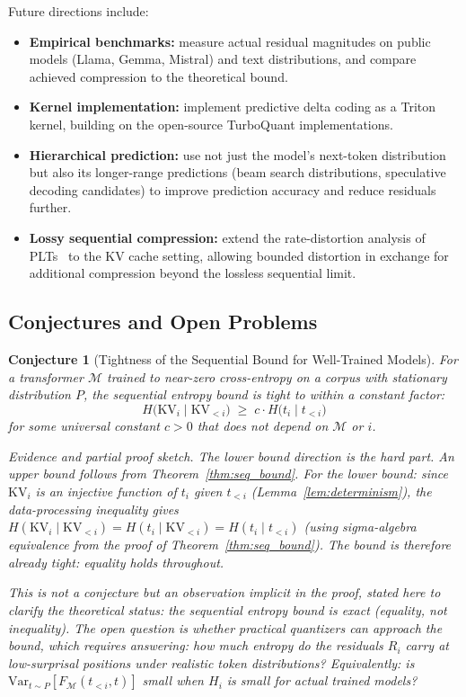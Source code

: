 \documentclass[11pt]{article}
\newtheorem{conjecture}{Conjecture}
\begin{document}
Future directions include:
\begin{itemize}[leftmargin=2em]
  \item \textbf{Empirical benchmarks:} measure actual residual magnitudes on
        public models (Llama, Gemma, Mistral) and text distributions, and
        compare achieved compression to the theoretical bound.
  \item \textbf{Kernel implementation:} implement predictive delta coding as a
        Triton kernel, building on the open-source TurboQuant implementations.
  \item \textbf{Hierarchical prediction:} use not just the model's next-token
        distribution but also its longer-range predictions (beam search
        distributions, speculative decoding candidates) to improve prediction
        accuracy and reduce residuals further.
  \item \textbf{Lossy sequential compression:} extend the rate-distortion
        analysis of PLTs~\cite{plt2026} to the KV cache setting, allowing
        bounded distortion in exchange for additional compression beyond the
        lossless sequential limit.
\end{itemize}

\subsection{Conjectures and Open Problems}

\begin{conjecture}[Tightness of the Sequential Bound for Well-Trained Models]
\label{conj:tight}
For a transformer $\mathcal{M}$ trained to near-zero cross-entropy on a corpus
with stationary distribution $P$, the sequential entropy bound is tight to within
a constant factor:
\[
  H\bigl(\mathrm{KV}_i \mid \mathrm{KV}_{<i}\bigr)
  \;\geq\; c \cdot H\bigl(t_i \mid t_{<i}\bigr)
\]
for some universal constant $c > 0$ that does not depend on $\mathcal{M}$ or $i$.

\emph{Evidence and partial proof sketch.}
The lower bound direction is the hard part.  An upper bound follows from
Theorem~\ref{thm:seq_bound}.  For the lower bound: since $\mathrm{KV}_i$ is an
injective function of $t_i$ given $t_{<i}$ (Lemma~\ref{lem:determinism}),
the data-processing inequality gives
$H(\mathrm{KV}_i \mid \mathrm{KV}_{<i}) = H(t_i \mid \mathrm{KV}_{<i}) = H(t_i \mid t_{<i})$
(using sigma-algebra equivalence from the proof of Theorem~\ref{thm:seq_bound}).
\emph{The bound is therefore already tight: equality holds throughout.}

This is not a conjecture but an observation implicit in the proof, stated here
to clarify the theoretical status: the sequential entropy bound is \emph{exact}
(equality, not inequality).  The open question is whether practical quantizers
can approach the bound, which requires answering: how much entropy do the
residuals $R_i$ carry at low-surprisal positions under realistic token
distributions?  Equivalently: is $\mathrm{Var}_{t \sim P}[F_{\mathcal{M}}(t_{<i},t)]$
small when $H_i$ is small for actual trained models?
\end{conjecture}
\end{document}
